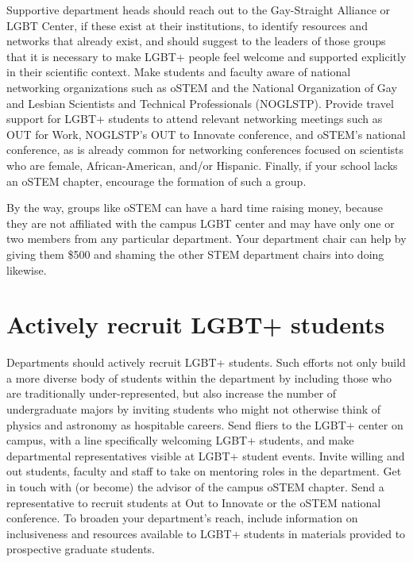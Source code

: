 Supportive department heads should reach out to the Gay-Straight Alliance or LGBT Center, if these exist at their institutions, to identify resources and networks that already exist, and should suggest to the leaders of those groups that it is necessary to make LGBT+ people feel welcome and supported explicitly in their scientific context. Make students and faculty aware of national networking organizations such as oSTEM and the National Organization of Gay and Lesbian Scientists and Technical Professionals (NOGLSTP). Provide travel support for LGBT+ students to attend relevant networking meetings such as OUT for Work, NOGLSTP's OUT to Innovate conference, and oSTEM's national conference, as is already common for networking conferences focused on scientists who are female, African-American, and/or Hispanic. Finally, if your school lacks an oSTEM chapter, encourage the formation of such a group.

By the way, groups like oSTEM  can have a hard time raising money, because they are not affiliated with the campus LGBT center and may have only one or two members from any particular department.  Your department chair can help by giving them \$500 and shaming the other STEM department chairs into doing likewise.

\newpage
\section {Actively recruit LGBT+ students}
\label{recruit-students}
Departments should actively recruit LGBT+ students. Such efforts not only build a more diverse body of students within the department by including those who are traditionally under-represented, but also increase the number of undergraduate majors by inviting students who might not otherwise think of physics and astronomy as hospitable careers.  Send fliers to the LGBT+ center on campus, with a line specifically welcoming LGBT+ students, and make departmental representatives visible at LGBT+ student events.  Invite willing and out students, faculty and staff to take on mentoring roles in the department.  Get in touch with (or become) the advisor of the campus oSTEM chapter.  Send a representative to recruit students at Out to Innovate or the oSTEM national conference.  To broaden your department's reach, include information on inclusiveness and resources available to LGBT+ students in materials provided to prospective graduate students. 

